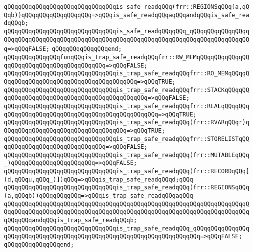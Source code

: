 \verb|qQQqqQQqqQQqqQQqqQQqqQQqqQQqqQQqis_safe_readqQQq(frr::REGIONSqQQq(a,qQQqb))qQQqqQQqqQQqqQQqqQQq=>qQQqis_safe_readqQQqaqQQqandqQQqis_safe_readqQQqb;|\newline
\verb|qQQqqQQqqQQqqQQqqQQqqQQqqQQqqQQqis_safe_readqQQqqQQq_qQQqqQQqqQQqqQQqqQQqqQQqqQQqqQQqqQQqqQQqqQQqqQQqqQQqqQQqqQQqqQQqqQQqqQQqqQQqqQQqqQQqqQQq=>qQQqFALSE;|\newline
\verb|qQQqqQQqqQQqqQQqend;|\newline
\newline
\verb|qQQqqQQqqQQqqQQqfunqQQqis_trap_safe_readqQQqfrr::RW_MEMqQQqqQQqqQQqqQQqqQQqqQQqqQQqqQQqqQQqqQQqqQQq=>qQQqFALSE;|\newline
\verb|qQQqqQQqqQQqqQQqqQQqqQQqqQQqqQQqis_trap_safe_readqQQqfrr::RO_MEMqQQqqQQqqQQqqQQqqQQqqQQqqQQqqQQqqQQqqQQqqQQq=>qQQqTRUE;|\newline
\verb|qQQqqQQqqQQqqQQqqQQqqQQqqQQqqQQqis_trap_safe_readqQQqfrr::STACKqQQqqQQqqQQqqQQqqQQqqQQqqQQqqQQqqQQqqQQqqQQqqQQq=>qQQqFALSE;|\newline
\verb|qQQqqQQqqQQqqQQqqQQqqQQqqQQqqQQqis_trap_safe_readqQQqfrr::REALqQQqqQQqqQQqqQQqqQQqqQQqqQQqqQQqqQQqqQQqqQQqqQQqqQQq=>qQQqTRUE;|\newline
\verb|qQQqqQQqqQQqqQQqqQQqqQQqqQQqqQQqis_trap_safe_readqQQq(frr::RVARqQQqr)qQQqqQQqqQQqqQQqqQQqqQQqqQQqqQQqqQQq=>qQQqTRUE;|\newline
\verb|qQQqqQQqqQQqqQQqqQQqqQQqqQQqqQQqis_trap_safe_readqQQqfrr::STORELISTqQQqqQQqqQQqqQQqqQQqqQQqqQQqqQQq=>qQQqFALSE;|\newline
\verb|qQQqqQQqqQQqqQQqqQQqqQQqqQQqqQQqis_trap_safe_readqQQq(frr::MUTABLEqQQq_)qQQqqQQqqQQqqQQqqQQqqQQq=>qQQqFALSE;|\newline
\verb|qQQqqQQqqQQqqQQqqQQqqQQqqQQqqQQqis_trap_safe_readqQQq(frr::RECORDqQQq[(d,qQQqu,qQQq_)])qQQq=>qQQqis_trap_safe_readqQQqd;qQQq|\newline
\verb|qQQqqQQqqQQqqQQqqQQqqQQqqQQqqQQqis_trap_safe_readqQQq(frr::REGIONSqQQq(a,qQQqb))qQQqqQQqqQQq=>qQQqis_trap_safe_readqQQqaqQQq|\newline
\verb|qQQqqQQqqQQqqQQqqQQqqQQqqQQqqQQqqQQqqQQqqQQqqQQqqQQqqQQqqQQqqQQqqQQqqQQqqQQqqQQqqQQqqQQqqQQqqQQqqQQqqQQqqQQqqQQqqQQqqQQqqQQqqQQqqQQqqQQqqQQqqQQqqQQqandqQQqis_trap_safe_readqQQqb;|\newline
\verb|qQQqqQQqqQQqqQQqqQQqqQQqqQQqqQQqis_trap_safe_readqQQq_qQQqqQQqqQQqqQQqqQQqqQQqqQQqqQQqqQQqqQQqqQQqqQQqqQQqqQQqqQQqqQQqqQQqqQQq=>qQQqFALSE;|\newline
\verb|qQQqqQQqqQQqqQQqend;|\newline
